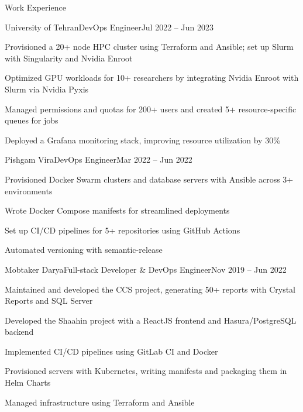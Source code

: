 \documentclass[]{main}
\begin{document}
\begin{section}{Work Experience}
 \begin{subsection}{University of Tehran}{DevOps Engineer}{Jul 2022 -- Jun 2023}{}
     \item Provisioned a 20+ node HPC cluster using Terraform and Ansible; set up Slurm with Singularity and Nvidia Enroot
     \item Optimized GPU workloads for 10+ researchers by integrating Nvidia Enroot with Slurm via Nvidia Pyxis
     \item Managed permissions and quotas for 200+ users and created 5+ resource-specific queues for jobs
     \item Deployed a Grafana monitoring stack, improving resource utilization by 30\%
 \end{subsection}

 \begin{subsection}{Pishgam Vira}{DevOps Engineer}{Mar 2022 -- Jun 2022}{}
     \item Provisioned Docker Swarm clusters and database servers with Ansible across 3+ environments
     \item Wrote Docker Compose manifests for streamlined deployments
     \item Set up CI/CD pipelines for 5+ repositories using GitHub Actions
     \item Automated versioning with semantic-release
 \end{subsection}

 \begin{subsection}{Mobtaker Darya}{Full-stack Developer \& DevOps Engineer}{Nov 2019 -- Jun 2022}{}
     \item Maintained and developed the CCS project, generating 50+ reports with Crystal Reports and SQL Server
     \item Developed the Shaahin project with a ReactJS frontend and Hasura/PostgreSQL backend
     \item Implemented CI/CD pipelines using GitLab CI and Docker
     \item Provisioned servers with Kubernetes, writing manifests and packaging them in Helm Charts
     \item Managed infrastructure using Terraform and Ansible
 \end{subsection}


\end{section}
\end{document}
